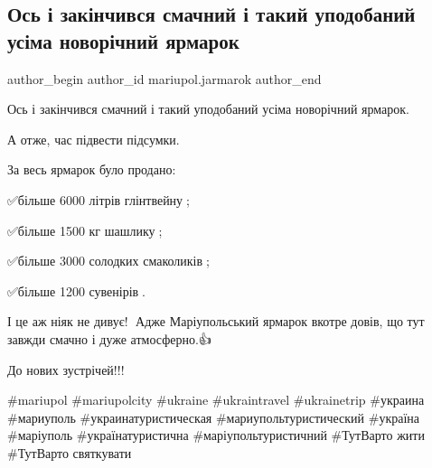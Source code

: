  
 
 
 
 

\subsection{Ось і закінчився смачний і такий уподобаний усіма новорічний ярмарок}
\label{sec:17_01_2022.fb.mariupol.jarmarok.1.novorichnyj_jarmarok}

\ifcmt
 author_begin
   author_id mariupol.jarmarok
 author_end
\fi

Ось і закінчився смачний і такий уподобаний усіма новорічний ярмарок.🎉

А отже, час підвести підсумки.📝

За весь ярмарок було продано:

✅більше 6000 літрів глінтвейну🍹;

✅більше 1500 кг шашлику🍢;

✅більше 3000 солодких смаколиків🍭;

✅більше 1200 сувенірів🎁.

І це аж ніяк не дивує!👏 Адже Маріупольський ярмарок вкотре довів, що тут
завжди смачно і дуже атмосферно.👍

До нових зустрічей!!!🤗

\#mariupol \#mariupolcity \#ukraine \#ukraintravel \#ukrainetrip \#украина
\#мариуполь \#украинатуристическая \#мариупольтуристический \#україна
\#маріуполь \#українатуристична \#маріупольтуристичний \#ТутВарто жити
\#ТутВарто святкувати
